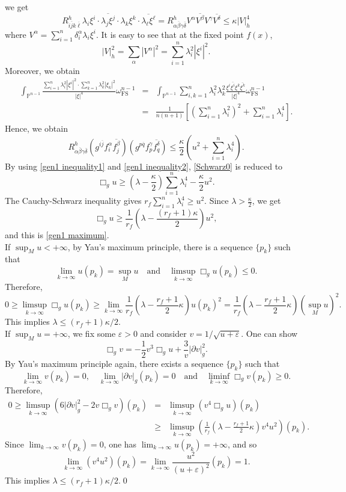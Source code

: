 \documentclass[12pt]{amsart}
\theoremstyle{plain}
\theoremstyle{definition}
\newcommand{\p}{\partial}
\renewcommand{\bar}{\overline}
\newcommand{\eps}{\varepsilon}
\newcommand{\beq}{\begin{equation}}
\newcommand{\eeq}{\end{equation}}
\newcommand{\ee}{\end{eqnarray*}}
\newcommand{\be}{\begin{eqnarray*}}
\newcommand{\qtq}[1]{\quad\mbox{#1}\quad}
\renewcommand{\>}{\rightarrow}
\renewcommand{\P}{{\mathbb P}}
\newcommand{\om}{\omega}
\numberwithin{equation}{section} %
\begin{document}
 we get
\beq R^h_{i\bar jk\bar\ell} \lambda_i\xi^i\cdot \bar{\lambda_j\xi^j}\cdot\lambda_k\xi^k\cdot\bar{\lambda_\ell\xi^\ell}
=R^h_{\alpha\bar\beta\gamma\bar\delta} V^\alpha\bar {V^\beta} V^\gamma \bar {V^\delta}\leq \kappa |V|^4_h\eeq
where $V^\alpha= \sum_{i=1}^n\delta_i ^\alpha \lambda_i \xi^i $. It is easy to see that at the fixed point $f(x)$,
\beq |V|^2_h=\sum_\alpha |V^\alpha|^2=\sum_{i=1}^n\lambda_i^2|\xi^i|^2. \label{inequality3}\eeq
Moreover, we obtain
\be  \int_{\P^{n-1}} \frac{ \sum_{i=1}^n\lambda_i^2|\xi^i|^2\cdot \sum_{k=1}^n\lambda_k^2|\xi_k|^2 }{|\xi|^4} \om_{\mathrm{FS}}^{n-1} &=& \int_{\P^{n-1}}  \sum_{i,k=1}^n \lambda_i^2\lambda_k^2
\frac{ \xi^i\bar{\xi^i}\xi^k\bar{\xi^k}   }{|\xi|^4}\om_{\mathrm{FS}}^{n-1}\\
& =& \frac{1}{n(n+1)} \left[ \left(\sum_{i=1}^n \lambda_i^2\right)^2 + \sum_{i=1}^n\lambda_i^4 \right] . \ee
Hence, we obtain 
\beq
R^h_{\alpha\bar\beta\gamma\bar\delta}
\left(g^{i\bar j} f^{\alpha}_i \bar{ f^{\beta}_j} \right) \left(g^{p\bar q} f^{\gamma}_p \bar{ f^{\delta}_q}  \right)
\le \frac{\kappa}{2} \left( u^2 + \sum_{i=1}^n\lambda_i^4 \right).
\label{gen1 inequality2}
\eeq
By using \eqref{gen1 inequality1} and \eqref{gen1 inequality2}, \eqref{Schwarz0} is reduced to
\beq
\Box_g u\ge \left(\lambda-\frac{\kappa}{2}\right)\sum_{i=1}^n\lambda_i^4 -\frac{\kappa}{2}u^2. \label{Cauchy}
\eeq
The Cauchy-Schwarz inequality gives $r_f\sum_{i=1}^n\lambda_i^4\ge u^2$.  Since $\lambda>\frac{\kappa}{2}$, we get
\beq
\Box_g u\ge \frac{1}{r_f}\left(\lambda-\frac{(r_f+1)\kappa}{2}\right)u^2, \label{elementary}
\eeq
and this is \eqref{gen1 maximum}.\\


 If $\sup_M u<+\infty$,  by Yau's maximum principle, there is a sequence $\{p_k\}$ such that
\beq
\lim_{k\to\infty} u(p_k)=\sup_M u\qtq{and}\limsup_{k\to\infty}\Box_gu(p_k)\le 0.
\eeq
Therefore,
\[
0\ge \limsup_{k\to\infty}\Box_gu(p_k)
\geq \lim_{k\to\infty}\frac{1}{r_f}\left(\lambda-\frac{r_f+1}{2}\kappa\right)u(p_k)^2
=\frac{1}{r_f}\left(\lambda-\frac{r_f+1}{2}\kappa\right)(\sup_M u)^2.
\]
This implies $\lambda\le (r_f+1)\kappa/2$.\\

 If  $\sup_M u=+\infty$,  we fix some $\eps>0$ and consider
$ v=1/\sqrt{u+\eps}$. One can show
\[
\Box_g v=-\frac{1}{2}v^3\Box_gu+\frac{3}{v}|\p v|_g^2.
\]
By Yau's maximum principle again, there exists a sequence $\{p_k\}$ such that
\beq
\lim_{k\to\infty} v(p_k)=0,\quad \lim_{k\to\infty}|\p v|_g(p_k)=0
\qtq{and}\liminf_{k\to\infty}\Box_gv(p_k)\ge 0.
\eeq
Therefore,
\be
0
\ge \limsup_{k\to\infty}\left(6|\p v|_g^2-2v\Box_gv\right)(p_k)
&=& \limsup_{k\to\infty}\left(v^4\Box_gu\right)(p_k)\\
&\ge& \limsup_{k\to\infty}\left(\frac{1}{r_f}\left(\lambda-\frac{r_f+1}{2}\kappa\right)v^4u^2\right)(p_k).
\ee
Since $\lim_{k\to\infty} v(p_k)=0$, one has $\lim_{k\to\infty} u(p_k)=+\infty$, and so
\beq
\lim_{k\to\infty}(v^4u^2)(p_k)=\lim_{k\to\infty}\frac{u^2}{(u+\eps)^2}(p_k)=1.
\eeq
This implies $\lambda\le (r_f+1)\kappa/2$.\qed
\end{document}
